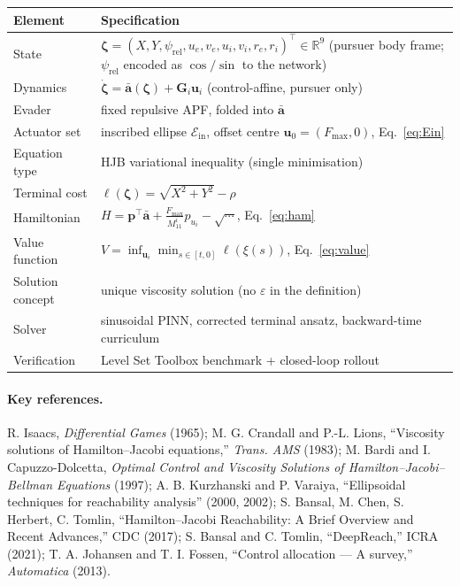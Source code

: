 \documentclass[11pt]{article}
\newcommand{\R}{\mathbb{R}}
\newcommand{\Ein}{\mathcal{E}_{\mathrm{in}}}
\newcommand{\zbf}{\bm{\zeta}}
\newcommand{\abf}{\bar{\bm{a}}}
\newcommand{\Gbf}{\bm{G}}
\newcommand{\ubf}{\bm{u}}
\newcommand{\pbf}{\bm{p}}
\begin{document}
\begin{center}
\begin{tabular}{@{}ll@{}}
\toprule
\textbf{Element} & \textbf{Specification}\\
\midrule
State & $\zbf=(X,Y,\psi_{\mathrm{rel}},u_e,v_e,u_i,v_i,r_e,r_i)^\top\in\R^9$ (pursuer body frame; $\psi_{\mathrm{rel}}$ encoded as $\cos/\sin$ to the network)\\
Dynamics & $\dot{\zbf}=\abf(\zbf)+\Gbf_i\ubf_i$ (control-affine, pursuer only)\\
Evader & fixed repulsive APF, folded into $\abf$\\
Actuator set & inscribed ellipse $\Ein$, offset centre $\ubf_0=(F_{\max},0)$, Eq.~\eqref{eq:Ein}\\
Equation type & HJB variational inequality (single minimisation)\\
Terminal cost & $\ell(\zbf)=\sqrt{X^2+Y^2}-\rho$\\
Hamiltonian & $H=\pbf^\top\abf+\tfrac{F_{\max}}{M_{11}^i}p_{u_i}-\sqrt{\cdots}$, Eq.~\eqref{eq:ham}\\
Value function & $V=\inf_{\ubf_i}\min_{s\in[t,0]}\ell(\xi(s))$, Eq.~\eqref{eq:value}\\
Solution concept & unique viscosity solution (no $\varepsilon$ in the definition)\\
Solver & sinusoidal PINN, corrected terminal ansatz, backward-time curriculum\\
Verification & Level Set Toolbox benchmark + closed-loop rollout\\
\bottomrule
\end{tabular}
\end{center}

\paragraph{Key references.} R. Isaacs, \emph{Differential Games} (1965); M. G. Crandall and
P.-L. Lions, ``Viscosity solutions of Hamilton--Jacobi equations,'' \emph{Trans. AMS} (1983);
M. Bardi and I. Capuzzo-Dolcetta, \emph{Optimal Control and Viscosity Solutions of
Hamilton--Jacobi--Bellman Equations} (1997); A. B. Kurzhanski and P. Varaiya, ``Ellipsoidal
techniques for reachability analysis'' (2000, 2002); S. Bansal, M. Chen, S. Herbert, C. Tomlin,
``Hamilton--Jacobi Reachability: A Brief Overview and Recent Advances,'' CDC (2017); S. Bansal and
C. Tomlin, ``DeepReach,'' ICRA (2021); T. A. Johansen and T. I. Fossen, ``Control allocation --- A
survey,'' \emph{Automatica} (2013).
\end{document}
